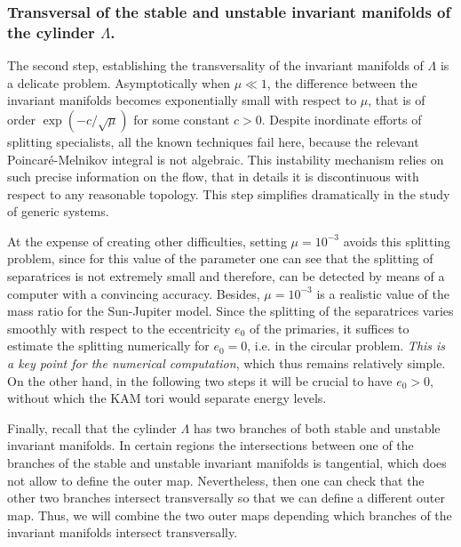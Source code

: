 \subsubsection{Transversal of the stable and unstable
  invariant manifolds of the cylinder $\Lambda$.}
The second step, establishing the transversality of the invariant
manifolds of $\Lambda$ is a delicate problem. Asymptotically when
$\mu\ll 1$, the difference between the invariant manifolds becomes
exponentially small with respect to $\mu$, that is of order
$\exp(-c/\sqrt{\mu})$ for some constant $c>0$. Despite inordinate
efforts of splitting specialists, all the known techniques fail here,
because the relevant Poincar{\'e}-Melnikov integral is not algebraic.
This instability mechanism relies on such precise information on the
flow, that in details it is discontinuous with respect to any
reasonable topology. This step simplifies dramatically in the study of
generic systems.

At the expense of creating other difficulties, setting $\mu=10^{-3}$
avoids this splitting problem, since for this value of the parameter
one can see that the splitting of separatrices is not extremely small
and therefore, can be detected by means of a computer with a convincing 
accuracy. Besides, $\mu=10^{-3}$ is a realistic value of the mass ratio
for the Sun-Jupiter model. Since the splitting of the separatrices
varies smoothly with respect to the eccentricity $e_0$ of the
primaries, it suffices to estimate the splitting numerically for
$e_0=0$, i.e. in the circular problem. \emph{This is a key
  point for the numerical computation}, which thus remains relatively
simple. On the other hand, in the following two steps it will be crucial
to have $e_0>0$, without which the KAM tori would separate energy
levels.

Finally, recall that the cylinder $\Lambda$ has two branches 
of both stable and unstable invariant manifolds. In certain 
regions the intersections between one of the branches of 
the stable and unstable  invariant manifolds is tangential, 
which does not allow to define the outer map. Nevertheless,
then one can check that the other two branches intersect 
transversally so that we can define a different outer map. 
Thus, we will combine the two outer maps depending which 
branches of the invariant manifolds intersect transversally.

